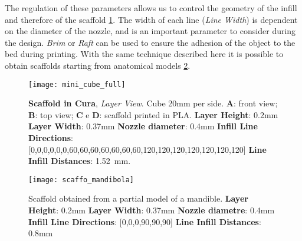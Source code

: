 The regulation of these parameters allows us to control the geometry of the infill and therefore of the scaffold \ref{fig:mini_cube_full}. The width of each line (\emph{Line Width}) is dependent on the diameter of the nozzle, and is an important parameter to consider during the design. \emph{Brim} or \emph{Raft} can be used to ensure the adhesion of the object to the bed during printing. With the same technique described here it is possible to obtain scaffolds starting from anatomical models \ref{fig:scaffo_mandibola}.
\begin{figure}[t]
\vspace{-10pt}
	\begin{center}
	\texttt{[image: mini\_cube\_full]}
    \caption{\textbf{Scaffold in Cura}, \emph{Layer View}. Cube 20mm per side.
\textbf{A}: front view; \textbf{B}: top view;
\textbf{C} e \textbf{D}: scaffold printed in PLA.
\textbf{Layer Height}: 0.2mm
\textbf{Layer Width}: 0.37mm
\textbf{Nozzle diameter}: 0.4mm
\textbf{Infill Line Directions}: [0,0,0,0,0,0,60,60,60,60,60\-,60,60,120,120,120,120,120,120,120]
\textbf{Line Infill Distances}: \SI{1.52}{\milli\metre}.}
    \label{fig:mini_cube_full}
	\end{center}
\vspace{-20pt}
\end{figure}

\begin{figure}[t]
\vspace{-10pt}
	\begin{center}
	\texttt{[image: scaffo\_mandibola]}
    \caption[LoF entry]{Scaffold obtained from a partial model of a mandible.
\textbf{Layer Height}: 0.2mm
\textbf{Layer Width}: 0.37mm
\textbf{Nozzle diametre}: 0.4mm
\textbf{Infill Line Directions}: [0,0,0,90,90,90]
\textbf{Line Infill Distances}: 0.8mm}
    \label{fig:scaffo_mandibola}
	\end{center}
\vspace{-20pt}
\end{figure}

